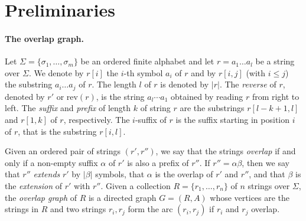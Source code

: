 \documentclass[runningheads,envcountsame,a4paper]{llncs}
\newcommand{\notaestesa}[2]{%
 \marginpar{\color{red!75!black}\textbf{\texttimes}}%
 {\color{red!75!black}%
 [\,\textbullet\,\textsf{\textbf{#1:}} %
 \textsf{\footnotesize#2}\,\textbullet\,]}%
}
\newcommand{\YP}[1]{\notaestesa{YP}{#1}}
\newcommand{\rev}{\ensuremath{\mathrm{rev}}}
\begin{document}
\section{Preliminaries}

\paragraph{The overlap graph.}
Let $\Sigma = \{\sigma_1, \dots, \sigma_m\}$ be an ordered finite
alphabet and let $r = a_1 \dots a_l$ be a string over $\Sigma$.
We denote by $r[i]$ the $i$-th symbol $a_i$ of $r$ and by $r[i,j]$ (with
$i \leq j$) the substring $a_i \dots a_j$ of $r$.
The length $l$ of $r$ is denoted by $|r|$.
The \emph{reverse} of $r$, denoted by $r'$ or $\rev(r)$, is the string
$a_l \cdots a_1$ obtained by reading $r$ from right to left.
The \emph{suffix} and \emph{prefix} of length $k$ of string $r$ are the
substrings $r[l-k +1, l]$ and $r[1, k]$ of $r$, respectively.
The $i$-suffix of $r$ is the suffix starting in position $i$ of $r$,
that is the substring $r[i, l]$.

Given an ordered pair of strings $(r', r'')$, we say that the strings
\emph{overlap} if and only if a non-empty suffix $\alpha$ of $r'$ is
also a prefix of $r''$.
If $r'' = \alpha \beta$, then we say that $r''$ \emph{extends} $r'$ by
$|\beta|$ symbols, that $\alpha$ is the overlap of $r'$ and $r''$, and
that $\beta$ is the \emph{extension} of $r'$ with $r''$.
Given a collection $R = \{r_1, \dots, r_n\}$ of $n$ strings over
$\Sigma$, the \emph{overlap graph} of $R$ is a directed graph $G=(R, A)$
whose vertices are the strings in $R$ and two strings
$r_i, r_j$ form the arc $(r_i, r_j)$ if $r_i$ and $r_j$ overlap.
\end{document}
